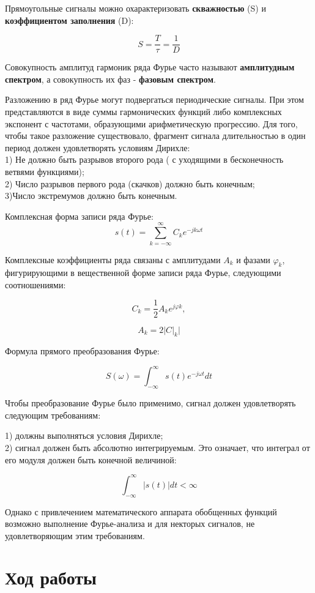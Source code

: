 \documentclass[12pt,a4paper]{scrartcl}
\begin{document}
Прямоугольные сигналы можно охарактеризовать \textbf{скважностью} (S) и \textbf{коэффициентом заполнения} (D):

$$S=\frac{T}{\tau}=\frac{1}{D}$$

Совокупность амплитуд гармоник ряда Фурье часто называют \textbf{амплитудным спектром}, а совокупность их фаз - \textbf{фазовым спектром}.

Разложению в ряд Фурье могут подвергаться периодические сигналы. При этом представляются в виде суммы гармонических функций либо комплексных экспонент с частотами, образующими арифметическую прогрессию. Для того, чтобы такое разложение существовало, фрагмент сигнала длительностью в один период должен удовлетворять условиям Дирихле:\\
1) Не должно быть разрывов второго рода ( с уходящими в бесконечность ветвями функциями);\\
2) Число разрывов первого рода (скачков) должно быть конечным;\\
3)Число экстремумов должно быть конечным.

Комплексная форма записи ряда Фурье:
$$s(t)=\sum_{k=-\infty}^\infty C_k e^{-jk\omega t}$$

Комплексные коэффициенты ряда связаны с амплитудами $A_k$ и фазами $\varphi _k$, фигурирующими в вещественной форме записи ряда Фурье, следующими соотношениями:

$$C_k = \frac{1}{2}A_k e^{j\varphi k},$$

$$A_k = 2|C|_k|$$

Формула прямого преобразования Фурье:

$$S(\omega) = \int_{-\infty}^\infty s(t) e^{-j\omega t} dt$$

Чтобы преобразование Фурье было применимо, сигнал должен удовлетворять следующим требованиям:

1) должны выполняться условия Дирихле;\\
2) сигнал должен быть абсолютно интегрируемым. Это означает, что интеграл от его модуля должен быть конечной величиной:

$$\int_{-\infty}^\infty|s(t)|dt<\infty$$

Однако с привлечением математического аппарата обобщенных функций возможно выполнение Фурье-анализа и для некторых сигналов, не удовлетворяющим этим требованиям.
\\

\newpage

\section{Ход работы}
\label{sec:work}
\end{document}
